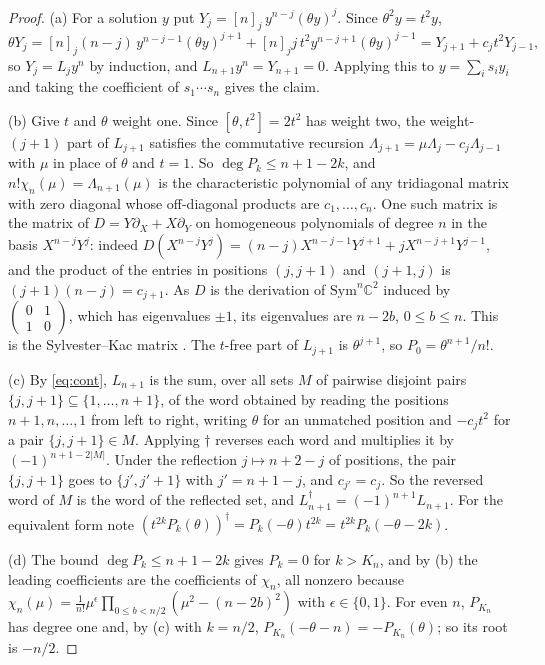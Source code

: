 \documentclass[11pt]{amsart}
\theoremstyle{definition}
\newcommand{\C}{\mathbb C}
\newcommand{\Sym}{\mathrm{Sym}}
\newcommand{\ff}[2]{[#1]_{#2}}
\begin{document}
\begin{proof}
(a) For a solution $y$ put $Y_j=\ff nj\,y^{n-j}(\theta y)^j$. Since $\theta^2y=t^2y$,
\[
\theta Y_j=\ff nj(n-j)\,y^{n-j-1}(\theta y)^{j+1}+\ff nj j\,t^2y^{n-j+1}(\theta y)^{j-1}=Y_{j+1}+c_jt^2Y_{j-1},
\]
so $Y_j=L_jy^n$ by induction, and $L_{n+1}y^n=Y_{n+1}=0$. Applying this to $y=\sum_is_iy_i$ and taking the coefficient of $s_1\cdots s_n$ gives the claim.

(b) Give $t$ and $\theta$ weight one. Since $[\theta,t^2]=2t^2$ has weight two, the weight-$(j+1)$ part of $L_{j+1}$ satisfies the commutative recursion $\Lambda_{j+1}=\mu\Lambda_j-c_j\Lambda_{j-1}$ with $\mu$ in place of $\theta$ and $t=1$. So $\deg P_k\le n+1-2k$, and $n!\chi_n(\mu)=\Lambda_{n+1}(\mu)$ is the characteristic polynomial of any tridiagonal matrix with zero diagonal whose off-diagonal products are $c_1,\dots,c_n$. One such matrix is the matrix of $D=Y\partial_X+X\partial_Y$ on homogeneous polynomials of degree $n$ in the basis $X^{n-j}Y^j$: indeed $D(X^{n-j}Y^j)=(n-j)X^{n-j-1}Y^{j+1}+jX^{n-j+1}Y^{j-1}$, and the product of the entries in positions $(j,j+1)$ and $(j+1,j)$ is $(j+1)(n-j)=c_{j+1}$. As $D$ is the derivation of $\Sym^n\C^2$ induced by $\left(\begin{smallmatrix}0&1\\1&0\end{smallmatrix}\right)$, which has eigenvalues $\pm1$, its eigenvalues are $n-2b$, $0\le b\le n$. This is the Sylvester--Kac matrix \cite{Kac47}. The $t$-free part of $L_{j+1}$ is $\theta^{j+1}$, so $P_0=\theta^{n+1}/n!$.

(c) By \eqref{eq:cont}, $L_{n+1}$ is the sum, over all sets $M$ of pairwise disjoint pairs $\{j,j+1\}\subseteq\{1,\dots,n+1\}$, of the word obtained by reading the positions $n+1,n,\dots,1$ from left to right, writing $\theta$ for an unmatched position and $-c_jt^2$ for a pair $\{j,j+1\}\in M$. Applying $\dagger$ reverses each word and multiplies it by $(-1)^{n+1-2|M|}$. Under the reflection $j\mapsto n+2-j$ of positions, the pair $\{j,j+1\}$ goes to $\{j',j'+1\}$ with $j'=n+1-j$, and $c_{j'}=c_j$. So the reversed word of $M$ is the word of the reflected set, and $L_{n+1}^\dagger=(-1)^{n+1}L_{n+1}$. For the equivalent form note $(t^{2k}P_k(\theta))^\dagger=P_k(-\theta)t^{2k}=t^{2k}P_k(-\theta-2k)$.

(d) The bound $\deg P_k\le n+1-2k$ gives $P_k=0$ for $k>K_n$, and by (b) the leading coefficients are the coefficients of $\chi_n$, all nonzero because $\chi_n(\mu)=\frac1{n!}\mu^{\epsilon}\prod_{0\le b<n/2}(\mu^2-(n-2b)^2)$ with $\epsilon\in\{0,1\}$. For even $n$, $P_{K_n}$ has degree one and, by (c) with $k=n/2$, $P_{K_n}(-\theta-n)=-P_{K_n}(\theta)$; so its root is $-n/2$.
\end{proof}
\end{document}
